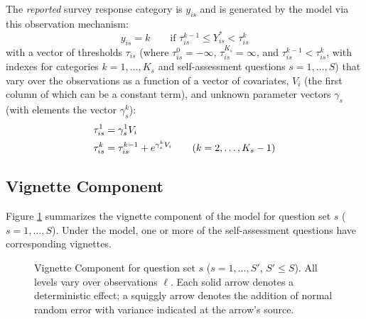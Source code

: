 \documentclass{amsart}
\begin{document}
The \emph{reported} survey response category is $y_{is}$ and is
generated by the model via this observation mechanism:
\begin{equation}
  \label{obsmech-s}
  y_{is} = k \qquad \text{if $\tau_{is}^{k-1}\leq Y_{is}^* < \tau_{is}^k$}
\end{equation}
with a vector of thresholds $\tau_{is}$ (where $\tau_{is}^0=-\infty$,
$\tau_{is}^{K_s}=\infty$, and $\tau^{k-1}_{is}<\tau^k_{is}$, with
indexes for categories $k=1,\dots,K_s$ and self-assessment questions
$s=1,\dots,S$) that vary over the observations as a function of a
vector of covariates, $V_i$ (the first column of which can be a
constant term), and unknown parameter vectors $\gamma_s$ (with
elements the vector $\gamma_s^k$):
\begin{align}
  \label{taus}
  \tau_{is}^1 &= \gamma_s^1 V_i \\ \notag \tau_{is}^k &=
  \tau^{k-1}_{is}+e^{\gamma_s^k V_i}\qquad (k=2,\dots,K_s-1)
\end{align}

\subsection{Vignette Component}

Figure \ref{f:vign} summarizes the vignette component of the model for
question set $s$ ($s=1,\dots,S$).  Under the model, one or more of the
self-assessment questions have corresponding vignettes.
\begin{figure}[t]
  \begin{center}
  \end{center}
  \caption{\label{f:vign}Vignette Component for question set $s$
    ($s=1,\dots,S'$, $S'\leq S$).  All levels vary over observations
    $\ell$.  Each solid arrow denotes a deterministic effect; a
    squiggly arrow denotes the addition of normal random error with
    variance indicated at the arrow's source.}
\end{figure}
\end{document}
